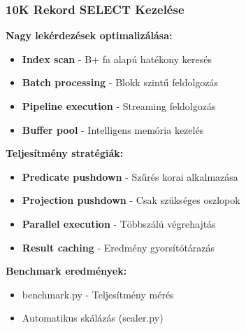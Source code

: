 \documentclass{beamer}
\begin{document}
\begin{frame}
\frametitle{10K Rekord SELECT Kezelése}

\textbf{Nagy lekérdezések optimalizálása:}
\begin{itemize}
    \item \textbf{Index scan} - B+ fa alapú hatékony keresés
    \item \textbf{Batch processing} - Blokk szintű feldolgozás
    \item \textbf{Pipeline execution} - Streaming feldolgozás
    \item \textbf{Buffer pool} - Intelligens memória kezelés
\end{itemize}

\vspace{0.3cm}
\textbf{Teljesítmény stratégiák:}
\begin{itemize}
    \item \textbf{Predicate pushdown} - Szűrés korai alkalmazása
    \item \textbf{Projection pushdown} - Csak szükséges oszlopok
    \item \textbf{Parallel execution} - Többszálú végrehajtás
    \item \textbf{Result caching} - Eredmény gyorsítótárazás
\end{itemize}

\vspace{0.3cm}
\textbf{Benchmark eredmények:}
\begin{itemize}
    \item benchmark.py - Teljesítmény mérés
    \item Automatikus skálázás (scaler.py)
\end{itemize}

\end{frame}
\end{document}
